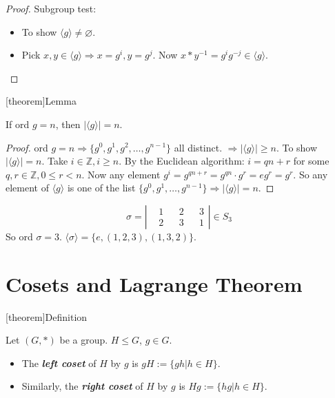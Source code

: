 \documentclass[12pt]{report}
\theoremstyle{definition}
\begin{document}
\begin{proof}
    Subgroup test: 
    \begin{itemize}
            \item To show $\langle g\rangle  \neq \varnothing$.
            \item Pick $x,y \in \langle g\rangle  \Rightarrow{} x = g^{i}, y = g^{j}$.
                Now $x * y^{-1} = g^{i}g^{-j} \in \langle g\rangle $.
    \end{itemize}
\end{proof}

[theorem]{Lemma}
\begin{ord of cyclic subgroup}
    If ord $g = n$, then $|\langle g\rangle | = n$.
\end{ord of cyclic subgroup}

\begin{proof}
    ord $g = n \Rightarrow{} \{g^{0}, g^{1}, g^{2}, \ldots, g^{n-1}\}$ all distinct.
    $\Rightarrow{} |\langle g\rangle | \ge n$.
    To show $|\langle g\rangle | = n$. Take $i \in \mathbb{Z}, i \ge n$.
    By the Euclidean algorithm: $i = qn + r$ for some $q, r \in \mathbb{Z}, 0 \le r < n$.
    Now any element $g^{i} = g^{qn + r} = g^{qn} \cdot g^{r} = e g^{r} = g^{r}$.
    So any element of $\langle g\rangle $ is one of the list $\{g^{0}, g^{1}, \ldots, g^{n - 1}\} \Rightarrow{}
    |\langle g\rangle | = n$.
\end{proof}

\begin{ex}
    \[
        \sigma = \left|
        \begin{align*}
            & 1 && 2 && 3 \\
            & 2 && 3 && 1
        \end{align*}
        \right| \in{}S_3
    \]So ord $\sigma = 3$.
    $\langle \sigma \rangle = \{ e, (1, 2, 3), (1, 3, 2)\}$.
\end{ex}

\section{Cosets and Lagrange Theorem}

[theorem]{Definition}
\begin{cosets}
    Let $(G, *)$ be a group. $H \le G$, $g \in G$.
    \begin{itemize}
            \item The \textbf{\emph{left coset}} of $H$ by $g$ is $gH := \{gh | h \in H\}$.
            \item Similarly, the \textbf{\emph{right coset}} of $H$ by $g$ is $Hg := \{hg | h \in H\}$.
    \end{itemize}
    
\end{cosets}
\end{document}
